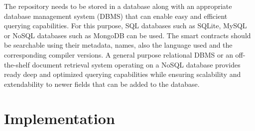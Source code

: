 \documentclass[10pt,conference]{IEEEtran}
\begin{document}
	The repository needs to be stored in a database along with an appropriate database management system (DBMS) that can enable easy and efficient querying capabilities. For this purpose, SQL databases such as SQLite, MySQL or NoSQL databases such as MongoDB can be used.  The smart contracts should be searchable using their metadata, names, also the language used and the corresponding compiler versions. A general purpose relational DBMS or an off-the-shelf document retrieval system operating on a NoSQL database provides ready deep and optimized querying capabilities while ensuring scalability and extendability to newer fields that can be added to the database.
	
	\section{Implementation}
	\label{sec:implementation}
	
\end{document}
